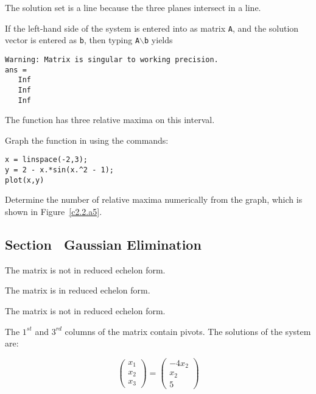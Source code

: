 \ans The solution set is a line because the three planes intersect in a line.

\soln If the left-hand side of the system is entered into \Matlab as
matrix {\tt A}, and the solution vector is entered as {\tt b}, then
typing {\tt A}$\backslash${\tt b} yields
\begin{verbatim}
Warning: Matrix is singular to working precision.
ans =
   Inf
   Inf
   Inf
\end{verbatim}

\ans The function has three relative maxima on this interval.

\soln Graph the function in \Matlab using the commands:
\begin{verbatim}
x = linspace(-2,3);
y = 2 - x.*sin(x.^2 - 1);
plot(x,y)
\end{verbatim}
Determine the number of relative maxima numerically from the graph, which
is shown in Figure~\ref{c2.2.a5}.

\begin{figure}[htb]
                       \centerline{%
                       }
\end{figure}






\subsection*{Section~\protect{\ref{S:Gauss}} Gaussian Elimination}


 The matrix is not in reduced echelon form.

\newpage
{} The matrix is in reduced echelon form.

 The matrix is not in reduced echelon form.

 The $1^{st}$ and $3^{rd}$ columns of the matrix contain
pivots.  The solutions of the system are:

\[
\left(\begin{array}{r} x_1 \\ x_2 \\ x_3\end{array} \right)
= \left(\begin{array}{c} -4x_2 \\ x_2 \\ 5\end{array} \right)
\]

